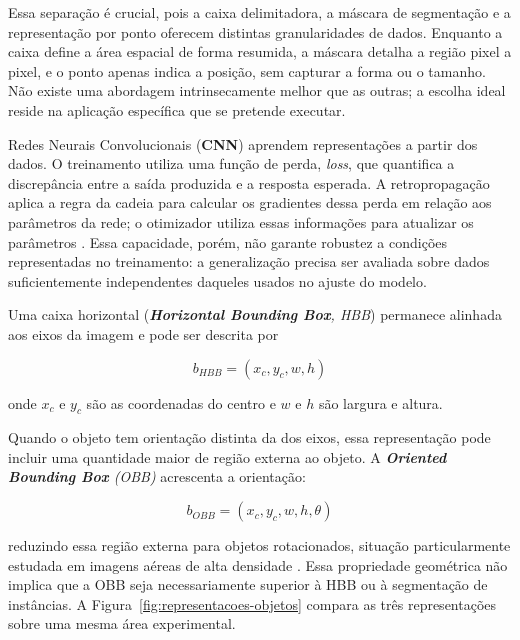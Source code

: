 Essa separa\c{c}\~ao \'e crucial, pois a caixa delimitadora, a m\'ascara de segmenta\c{c}\~ao e a representa\c{c}\~ao por ponto oferecem distintas granularidades de dados. Enquanto a caixa define a \'area espacial de forma resumida, a m\'ascara detalha a regi\~ao pixel a pixel, e o ponto apenas indica a posi\c{c}\~ao, sem capturar a forma ou o tamanho. N\~ao existe uma abordagem intrinsecamente melhor que as outras; a escolha ideal reside na aplica\c{c}\~ao espec\'ifica que se pretende executar.

Redes Neurais Convolucionais (\textbf{CNN}) aprendem representa\c{c}\~oes a partir dos dados. O treinamento utiliza uma fun\c{c}\~ao de perda, \textit{loss}, que quantifica a discrep\^ancia entre a sa\'ida produzida e a resposta esperada. A retropropaga\c{c}\~ao aplica a regra da cadeia para calcular os gradientes dessa perda em rela\c{c}\~ao aos par\^ametros da rede; o otimizador utiliza essas informa\c{c}\~oes para atualizar os par\^ametros \citep{pytorch2024}. Essa capacidade, por\'em, n\~ao garante robustez a condi\c{c}\~oes representadas no treinamento: a generaliza\c{c}\~ao precisa ser avaliada sobre dados suficientemente independentes daqueles usados no ajuste do modelo.

Uma caixa horizontal (\textit{\textbf{Horizontal Bounding Box}, HBB}) permanece alinhada aos eixos da imagem e pode ser descrita por

\begin{equation}
  b_{HBB} = \left(x_c, y_c, w, h\right)
  \label{eq:hbb}
\end{equation}

onde $x_c$ e $y_c$ s\~ao as coordenadas do centro e $w$ e $h$ s\~ao largura e altura.

Quando o objeto tem orienta\c{c}\~ao distinta da dos eixos, essa representa\c{c}\~ao pode incluir uma quantidade maior de regi\~ao externa ao objeto. A \textit{\textbf{Oriented Bounding Box} (OBB)} acrescenta a orienta\c{c}\~ao:

\begin{equation}
  b_{OBB} = \left(x_c, y_c, w, h, \theta\right)
  \label{eq:obb}
\end{equation}

reduzindo essa regi\~ao externa para objetos rotacionados, situa\c{c}\~ao particularmente estudada em imagens a\'ereas de alta densidade \citep{ding2019}. Essa propriedade geom\'etrica n\~ao implica que a OBB seja necessariamente superior \`a HBB ou \`a segmenta\c{c}\~ao de inst\^ancias. A Figura~\ref{fig:representacoes-objetos} compara as tr\^es representa\c{c}\~oes sobre uma mesma \'area experimental.

